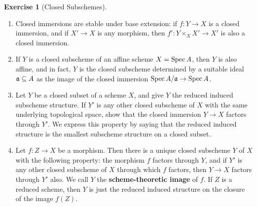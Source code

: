 \documentclass[]{pcmi}
\theoremstyle{plain}
\theoremstyle{definition}
\newtheorem{Exercise}[subsubsection]{Exercise}
\theoremstyle{remark}
\begin{document}
\begin{Exercise}[Closed Subschemes]
    \phantom{h}
    \begin{enumerate}[label = (\alph*)]
        \item Closed immersions are stable under base extension: if $f : Y \to X$ is a closed immersion, and if $X' \to X$ is any morphism, then $f' : Y \times_X X' \to X'$ is also a closed immersion. 
        
        \item If $Y$ is a closed subscheme of an affine scheme $X = \operatorname{Spec} A$, then $Y$ is also affine, and in fact, $Y$ is the closed subscheme determined by a suitable ideal $\mathfrak{a} \subseteq A$ as the image of the closed immersion $\operatorname{Spec} A/\mathfrak{a} \to \operatorname{Spec} A$. 
        \item Let $Y$ be a closed subset of a scheme $X$, and give $Y$ the reduced induced subscheme structure. If $Y'$ is any other closed subscheme of $X$ with the same underlying topological space, show that the closed immersion $Y \to X$ factors through $Y'$. We express this property by saying that the reduced induced structure is the smallest subscheme structure on a closed subset. 
        \item Let $f : Z \to X$ be a morphism. Then there is a unique closed subscheme $Y$ of $X$ with the following property: the morphism $f$ factors through $Y$, and if $Y'$ is any other closed subscheme of $X$ through which $f$ factors, then $Y \to X$ factors through $Y'$ also. We call $Y$ the \textbf{scheme-theoretic image} of $f$. If $Z$ is a reduced scheme, then $Y$ is just the reduced induced structure on the closure of the image $f(Z)$. 
    \end{enumerate}
\end{Exercise}
\end{document}
